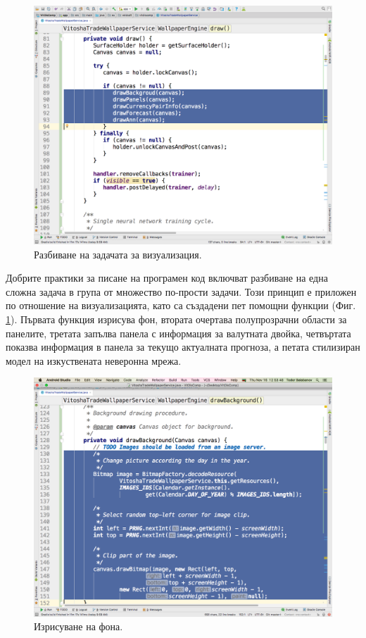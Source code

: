 \documentclass[book,14pt,oneside,openany]{memoir}
\begin{document}
\begin{figure}[h]
  \centering
  \includegraphics[height=0.45\pdfpageheight]{pic0051}
  \caption{Разбиване на задачата за визуализация.}
\label{fig:pic0051}
\end{figure}
\FloatBarrier

Добрите практики за писане на програмен код включват разбиване на една сложна задача в група от множество по-прости задачи. Този принцип е приложен по отношение на визуализацията, като са създадени пет помощни функции (Фиг. \ref{fig:pic0051}).  Първата функция изрисува фон, втората очертава полупрозрачни области за панелите, третата запълва панела с информация за валутната двойка, четвъртата показва информация в панела за текущо актуалната прогноза, а петата стилизиран модел на изкуствената неверонна мрежа. 

\begin{figure}[h]
  \centering
  \includegraphics[height=0.45\pdfpageheight]{pic0052}
  \caption{Изрисуване на фона.}
\label{fig:pic0052}
\end{figure}
\FloatBarrier
\end{document}
